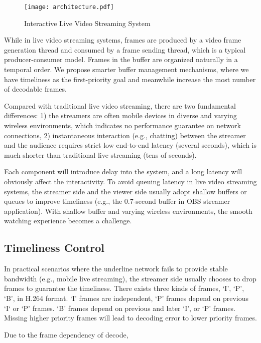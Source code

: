 \begin{figure}[t]
\centering
\texttt{[image: architecture.pdf]}
\vspace{-0.08in}
\caption{Interactive Live Video Streaming System}
\vspace{-0.1in}
\label{fig_architecture}
\end{figure}

While in live video streaming systems, frames are produced by a video frame generation thread and consumed by a frame sending thread, which is a typical producer-consumer model. Frames in the buffer are organized naturally in a temporal order. We propose smarter buffer management mechanisms, where we have timeliness as the first-priority goal and meanwhile increase the most number of decodable frames.

Compared with traditional live video streaming, there are two fundamental differences: 1) the streamers are often mobile devices in diverse and varying wireless environments, which indicates no performance guarantee on network connections, 2) instantaneous interaction (e.g., chatting) between the streamer and the audience requires strict low end-to-end latency (several seconds), which is much shorter than traditional live streaming (tens of seconds).

Each component will introduce delay into the system, and a long latency will obviously affect the interactivity. To avoid queuing latency in live video streaming systems, the streamer side and the viewer side usually adopt shallow buffers or queues to improve timeliness (e.g., the 0.7-second buffer in OBS streamer application).
With shallow buffer and varying wireless environments, the smooth watching experience becomes a challenge.

\subsection{Timeliness Control}
In practical scenarios where the underline network fails to provide stable bandwidth (e.g., mobile live streaming), the streamer side usually chooses to drop frames to guarantee the timeliness.
There exists three kinds of frames, `I', `P', `B', in H.264 format. `I' frames are independent, `P' frames depend on previous `I` or `P' frames. `B' frames depend on previous and later `I', or `P' frames. Missing higher priority frames will lead to decoding error to lower priority frames.

Due to the frame dependency of decode,
\fi 
